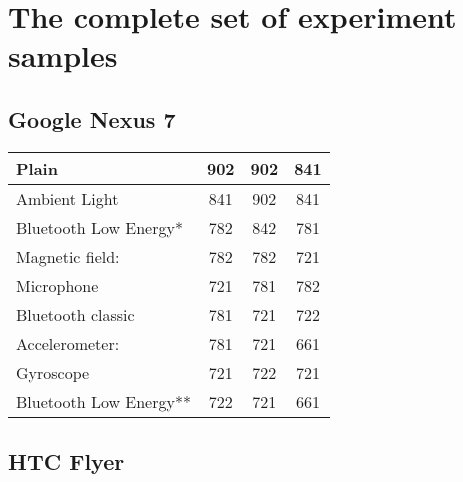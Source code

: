 \section{The complete set of experiment samples}
\subsection{Google Nexus 7}	

\begin{table}
    \begin{tabular}{| l | c | c | c |}
    \hline
    Plain                  & 902 & 902 & 841 \\ \hline
    Ambient Light          & 841 & 902 & 841\\ \hline
    Bluetooth Low Energy*  & 782 & 842 & 781 \\ \hline
    Magnetic field:        & 782 & 782 & 721\\ \hline
    Microphone             & 721 & 781 & 782 \\ \hline
    Bluetooth classic      & 781 & 721 & 722 \\ \hline
    Accelerometer:         & 781 & 721 & 661 \\ \hline
    Gyroscope              & 721 & 722 & 721 \\ \hline
    Bluetooth Low Energy** & 722 & 721 & 661 \\ \hline
    \end{tabular}
\end{table}

\subsection{HTC Flyer}	

